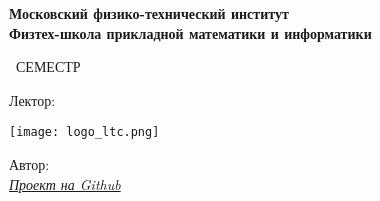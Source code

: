 \begin{titlepage}
	\clearpage\thispagestyle{empty}
	\centering
	
	\textbf{Московский физико-технический институт \\ Физтех-школа прикладной математики и информатики}
	\vspace{33ex}
	
	{\textbf{\FullCourseNameFirstPart}}
	
	\SemesterNumber\ СЕМЕСТР
	\vspace{1ex}
	
	Лектор: \textit{\LecturerInitials}
	
	\texttt{[image: logo\_ltc.png]}

	\begin{flushright}
		\noindent
		Автор: \href{\VKLink}{\textit{\AuthorInitials}}
		\\
		\href{\GithubLink}{\textit{Проект на Github}}
	\end{flushright}
	
	\vfill
	\CourseDate
	\pagebreak
\end{titlepage}
